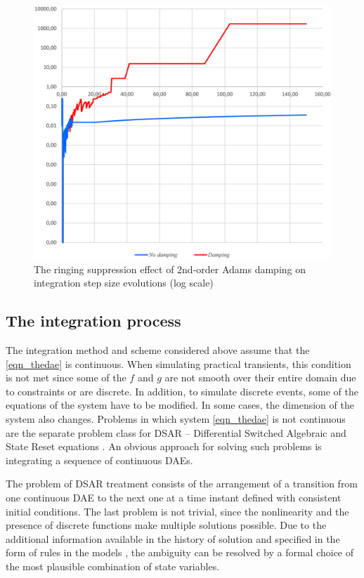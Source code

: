 \documentclass[lettersize,journal]{IEEEtran}
\begin{document}
\begin{figure}[htbp]
	\centering
	\includegraphics[width=0.8\columnwidth]{adams_damping_step.eps}
	\caption{The ringing suppression effect of 2nd-order Adams damping on integration step size evolutions (log scale) }
	\label{fig_adams_damping_step}
\end{figure}

\subsection {The integration process}
The integration method and scheme considered above assume that the \eqref{eqn_thedae} is continuous. When simulating practical transients, this condition is not met since some of the \(f\) and \(g\) are not smooth over their entire domain due to constraints or are discrete. In addition, to simulate discrete events, some of the equations of the system have to be modified. In some cases, the dimension of the system also changes. Problems in which system \eqref{eqn_thedae} is not continuous are the separate problem class for DSAR – Differential Switched Algebraic and State Reset equations \cite{Hiskens01}. An obvious approach for solving such problems is integrating a sequence of continuous DAEs.

The problem of DSAR treatment consists of the arrangement of a transition from one continuous DAE to the next one at a time instant defined with consistent initial conditions. The last problem is not trivial, since the nonlinearity and the presence of discrete functions make multiple solutions possible. Due to the additional information available in the history of solution and specified in the form of rules in the models \cite{mycompiler}, the ambiguity can be resolved by a formal choice of the most plausible combination of state variables.
\end{document}
